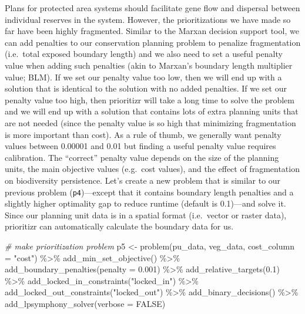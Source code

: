 \documentclass[
  12pt,
]{book}
\newenvironment{Shaded}{\begin{snugshade}}{\end{snugshade}}
\newcommand{\AttributeTok}[1]{\textcolor[rgb]{0.77,0.63,0.00}{#1}}
\newcommand{\CommentTok}[1]{\textcolor[rgb]{0.56,0.35,0.01}{\textit{#1}}}
\newcommand{\ConstantTok}[1]{\textcolor[rgb]{0.00,0.00,0.00}{#1}}
\newcommand{\FloatTok}[1]{\textcolor[rgb]{0.00,0.00,0.81}{#1}}
\newcommand{\FunctionTok}[1]{\textcolor[rgb]{0.00,0.00,0.00}{#1}}
\newcommand{\NormalTok}[1]{#1}
\newcommand{\OtherTok}[1]{\textcolor[rgb]{0.56,0.35,0.01}{#1}}
\newcommand{\SpecialCharTok}[1]{\textcolor[rgb]{0.00,0.00,0.00}{#1}}
\newcommand{\StringTok}[1]{\textcolor[rgb]{0.31,0.60,0.02}{#1}}
\begin{document}
Plans for protected area systems should facilitate gene flow and dispersal between individual reserves in the system. However, the prioritizations we have made so far have been highly fragmented. Similar to the Marxan decision support tool, we can add penalties to our conservation planning problem to penalize fragmentation (i.e.~total exposed boundary length) and we also need to set a useful penalty value when adding such penalties (akin to Marxan's boundary length multiplier value; BLM). If we set our penalty value too low, then we will end up with a solution that is identical to the solution with no added penalties. If we set our penalty value too high, then prioritizr will take a long time to solve the problem and we will end up with a solution that contains lots of extra planning units that are not needed (since the penalty value is so high that minimizing fragmentation is more important than cost). As a rule of thumb, we generally want penalty values between 0.00001 and 0.01 but finding a useful penalty value requires calibration. The ``correct'' penalty value depends on the size of the planning units, the main objective values (e.g.~cost values), and the effect of fragmentation on biodiversity persistence. Let's create a new problem that is similar to our previous problem (\texttt{p4})---except that it contains boundary length penalties and a slightly higher optimality gap to reduce runtime (default is 0.1)---and solve it. Since our planning unit data is in a spatial format (i.e.~vector or raster data), prioritizr can automatically calculate the boundary data for us.

\clearpage

\begin{Shaded}
\begin{Highlighting}[]
\CommentTok{\# make prioritization problem}
\NormalTok{p5 }\OtherTok{\textless{}{-}} \FunctionTok{problem}\NormalTok{(pu\_data, veg\_data, }\AttributeTok{cost\_column =} \StringTok{"cost"}\NormalTok{) }\SpecialCharTok{\%\textgreater{}\%}
      \FunctionTok{add\_min\_set\_objective}\NormalTok{() }\SpecialCharTok{\%\textgreater{}\%}
      \FunctionTok{add\_boundary\_penalties}\NormalTok{(}\AttributeTok{penalty =} \FloatTok{0.001}\NormalTok{) }\SpecialCharTok{\%\textgreater{}\%}
      \FunctionTok{add\_relative\_targets}\NormalTok{(}\FloatTok{0.1}\NormalTok{) }\SpecialCharTok{\%\textgreater{}\%}
      \FunctionTok{add\_locked\_in\_constraints}\NormalTok{(}\StringTok{"locked\_in"}\NormalTok{) }\SpecialCharTok{\%\textgreater{}\%}
      \FunctionTok{add\_locked\_out\_constraints}\NormalTok{(}\StringTok{"locked\_out"}\NormalTok{) }\SpecialCharTok{\%\textgreater{}\%}
      \FunctionTok{add\_binary\_decisions}\NormalTok{() }\SpecialCharTok{\%\textgreater{}\%}
      \FunctionTok{add\_lpsymphony\_solver}\NormalTok{(}\AttributeTok{verbose =} \ConstantTok{FALSE}\NormalTok{)}
\end{Highlighting}
\end{Shaded}
\end{document}
